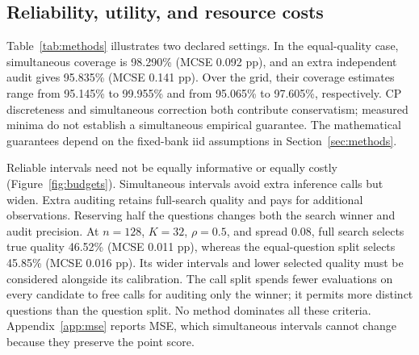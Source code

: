 \subsection{Reliability, utility, and resource costs}
Table~\ref{tab:methods} illustrates two declared settings. In the equal-quality case, simultaneous coverage is 98.290\% (MCSE 0.092 pp), and an extra independent audit gives 95.835\% (MCSE 0.141 pp). Over the grid, their coverage estimates range from 95.145\% to 99.955\% and from 95.065\% to 97.605\%, respectively. CP discreteness and simultaneous correction both contribute conservatism; measured minima do not establish a simultaneous empirical guarantee. The mathematical guarantees depend on the fixed-bank iid assumptions in Section~\ref{sec:methods}.

\begin{table}[t]
\caption{\textbf{Reporting protocols under two declared settings.} Entries are means (MCSE) from 20,000 independent repetitions. Bias is reported score minus the protocol's selected true accuracy. Width concerns nominal 95\% CP intervals; quality is the selected true accuracy. Bias and width are percentage points (pp), coverage and quality are percent. Both settings have $\rho=0.5$. Simultaneous CP retains the reused point score. Extra audit adds $n$ calls; question split preserves $n$ total questions; call split preserves $nK$ total calls. Parenthetical errors rounded to 0.000 are below 0.0005 in displayed units or exactly zero for constant truth. Full precision and counts accompany the source CSV.}
\label{tab:methods}
\centering
{\fontsize{8}{9}\selectfont}
\end{table}

Reliable intervals need not be equally informative or equally costly (Figure~\ref{fig:budgets}). Simultaneous intervals avoid extra inference calls but widen. Extra auditing retains full-search quality and pays for additional observations. Reserving half the questions changes both the search winner and audit precision. At $n=128$, $K=32$, $\rho=0.5$, and spread 0.08, full search selects true quality 46.52\% (MCSE 0.011 pp), whereas the equal-question split selects 45.85\% (MCSE 0.016 pp). Its wider intervals and lower selected quality must be considered alongside its calibration. The call split spends fewer evaluations on every candidate to free calls for auditing only the winner; it permits more distinct questions than the question split. No method dominates all these criteria. Appendix~\ref{app:mse} reports MSE, which simultaneous intervals cannot change because they preserve the point score.

